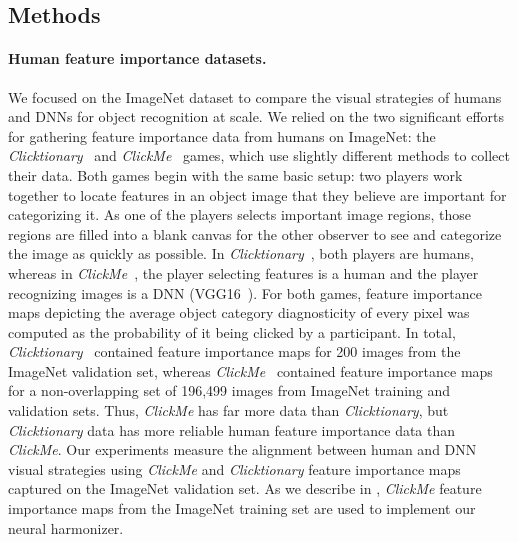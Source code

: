 \subsection{Methods}\label{sec:methods}
\paragraph{Human feature importance datasets.} We focused on the ImageNet dataset to compare the visual strategies of humans and DNNs for object recognition at scale. We relied on the two significant efforts for gathering feature importance data from humans on ImageNet: the \textit{Clicktionary}~\cite{Linsley2017-qe} and \textit{ClickMe}~\cite{Linsley2019-ew} games, which use slightly different methods to collect their data. Both games begin with the same basic setup: two players work together to locate features in an object image that they believe are important for categorizing it. As one of the players selects important image regions, those regions are filled into a blank canvas for the other observer to see and categorize the image as quickly as possible. In \textit{Clicktionary}~\cite{Linsley2017-qe}, both players are humans, whereas in \textit{ClickMe}~\cite{Linsley2019-ew}, the player selecting features is a human and the player recognizing images is a DNN (VGG16~\cite{Simonyan2014-jd}). For both games, feature importance maps depicting the average object category diagnosticity of every pixel was computed as the probability of it being clicked by a participant. In total, \textit{Clicktionary}~\cite{Linsley2017-qe} contained feature importance maps for 200 images from the ImageNet validation set, whereas \textit{ClickMe}~\cite{Linsley2019-ew} contained feature importance maps for a non-overlapping set of 196,499 images from ImageNet training and validation sets. Thus, \textit{ClickMe} has far more data than \textit{Clicktionary}, but \textit{Clicktionary} data has more reliable human feature importance data than \textit{ClickMe}. Our experiments measure the alignment between human and DNN visual strategies using \textit{ClickMe} and \textit{Clicktionary} feature importance maps captured on the ImageNet validation set. As we describe in \textsection{\ref{sec:meta_pred}}, \textit{ClickMe} feature importance maps from the ImageNet training set are used to implement our neural harmonizer.

